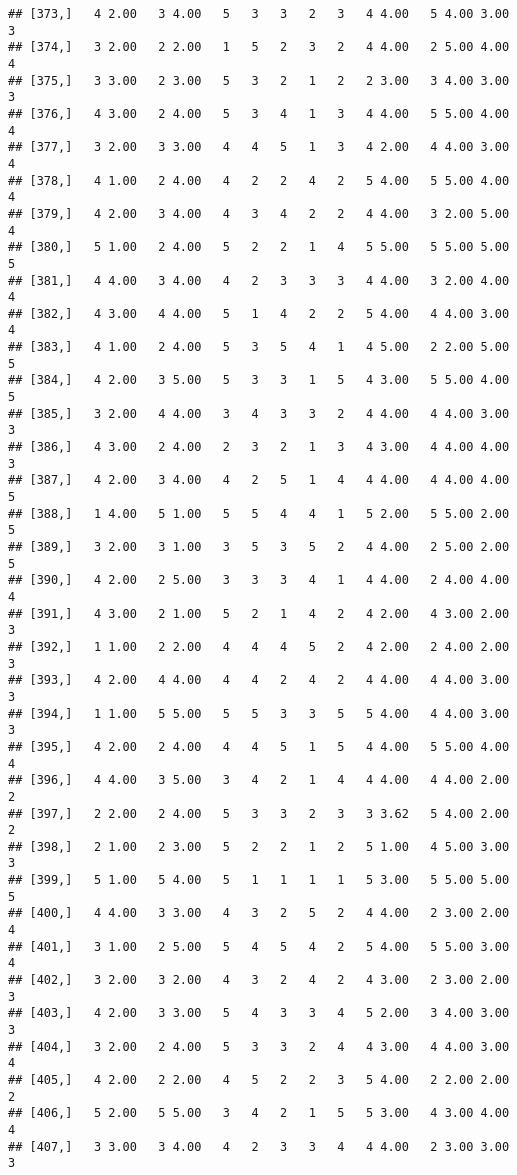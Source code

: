 \documentclass[]{article}
\begin{document}
\begin{verbatim}
## [373,]   4 2.00   3 4.00   5   3   3   2   3   4 4.00   5 4.00 3.00   3
## [374,]   3 2.00   2 2.00   1   5   2   3   2   4 4.00   2 5.00 4.00   4
## [375,]   3 3.00   2 3.00   5   3   2   1   2   2 3.00   3 4.00 3.00   3
## [376,]   4 3.00   2 4.00   5   3   4   1   3   4 4.00   5 5.00 4.00   4
## [377,]   3 2.00   3 3.00   4   4   5   1   3   4 2.00   4 4.00 3.00   4
## [378,]   4 1.00   2 4.00   4   2   2   4   2   5 4.00   5 5.00 4.00   4
## [379,]   4 2.00   3 4.00   4   3   4   2   2   4 4.00   3 2.00 5.00   4
## [380,]   5 1.00   2 4.00   5   2   2   1   4   5 5.00   5 5.00 5.00   5
## [381,]   4 4.00   3 4.00   4   2   3   3   3   4 4.00   3 2.00 4.00   4
## [382,]   4 3.00   4 4.00   5   1   4   2   2   5 4.00   4 4.00 3.00   4
## [383,]   4 1.00   2 4.00   5   3   5   4   1   4 5.00   2 2.00 5.00   5
## [384,]   4 2.00   3 5.00   5   3   3   1   5   4 3.00   5 5.00 4.00   5
## [385,]   3 2.00   4 4.00   3   4   3   3   2   4 4.00   4 4.00 3.00   3
## [386,]   4 3.00   2 4.00   2   3   2   1   3   4 3.00   4 4.00 4.00   3
## [387,]   4 2.00   3 4.00   4   2   5   1   4   4 4.00   4 4.00 4.00   5
## [388,]   1 4.00   5 1.00   5   5   4   4   1   5 2.00   5 5.00 2.00   5
## [389,]   3 2.00   3 1.00   3   5   3   5   2   4 4.00   2 5.00 2.00   5
## [390,]   4 2.00   2 5.00   3   3   3   4   1   4 4.00   2 4.00 4.00   4
## [391,]   4 3.00   2 1.00   5   2   1   4   2   4 2.00   4 3.00 2.00   3
## [392,]   1 1.00   2 2.00   4   4   4   5   2   4 2.00   2 4.00 2.00   3
## [393,]   4 2.00   4 4.00   4   4   2   4   2   4 4.00   4 4.00 3.00   3
## [394,]   1 1.00   5 5.00   5   5   3   3   5   5 4.00   4 4.00 3.00   3
## [395,]   4 2.00   2 4.00   4   4   5   1   5   4 4.00   5 5.00 4.00   4
## [396,]   4 4.00   3 5.00   3   4   2   1   4   4 4.00   4 4.00 2.00   2
## [397,]   2 2.00   2 4.00   5   3   3   2   3   3 3.62   5 4.00 2.00   2
## [398,]   2 1.00   2 3.00   5   2   2   1   2   5 1.00   4 5.00 3.00   3
## [399,]   5 1.00   5 4.00   5   1   1   1   1   5 3.00   5 5.00 5.00   5
## [400,]   4 4.00   3 3.00   4   3   2   5   2   4 4.00   2 3.00 2.00   4
## [401,]   3 1.00   2 5.00   5   4   5   4   2   5 4.00   5 5.00 3.00   4
## [402,]   3 2.00   3 2.00   4   3   2   4   2   4 3.00   2 3.00 2.00   3
## [403,]   4 2.00   3 3.00   5   4   3   3   4   5 2.00   3 4.00 3.00   3
## [404,]   3 2.00   2 4.00   5   3   3   2   4   4 3.00   4 4.00 3.00   4
## [405,]   4 2.00   2 2.00   4   5   2   2   3   5 4.00   2 2.00 2.00   2
## [406,]   5 2.00   5 5.00   3   4   2   1   5   5 3.00   4 3.00 4.00   4
## [407,]   3 3.00   3 4.00   4   2   3   3   4   4 4.00   2 3.00 3.00   3

\end{verbatim}
\end{document}
